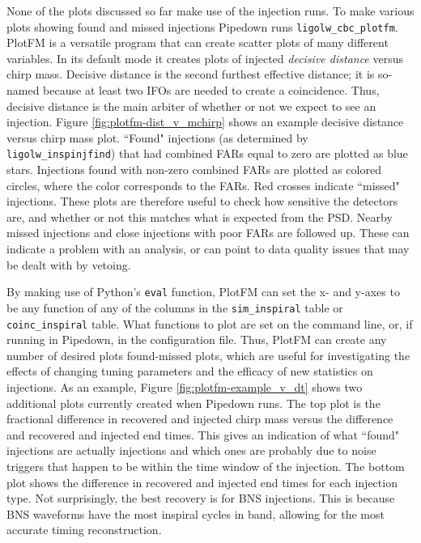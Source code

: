 None of the plots discussed so far make use of the injection runs. To make various plots showing found and missed injections Pipedown runs \verb|ligolw_cbc_plotfm|. PlotFM is a versatile program that can create scatter plots of many different variables. In its default mode it creates plots of injected \emph{decisive distance} versus chirp mass. Decisive distance is the second furthest effective distance; it is so-named because at least two \acp{IFO} are needed to create a coincidence. Thus, decisive distance is the main arbiter of whether or not we expect to see an injection. Figure \ref{fig:plotfm-dist_v_mchirp} shows an example decisive distance versus chirp mass plot. ``Found" injections (as determined by \verb|ligolw_inspinjfind|) that had combined \acp{FAR} equal to zero are plotted as blue stars. Injections found with non-zero combined \acp{FAR} are plotted as colored circles, where the color corresponds to the \acp{FAR}. Red crosses indicate ``missed" injections. These plots are therefore useful to check how sensitive the detectors are, and whether or not this matches what is expected from the \ac{PSD}. Nearby missed injections and close injections with poor \acp{FAR} are followed up. These can indicate a problem with an analysis, or can point to data quality issues that may be dealt with by vetoing.

By making use of Python's \verb|eval| function, PlotFM can set the x- and y-axes to be any function of any of the columns in the \verb|sim_inspiral| table or \verb|coinc_inspiral| table. What functions to plot are set on the command line, or, if running in Pipedown, in the configuration file. Thus, PlotFM can create any number of desired plots found-missed plots, which are useful for investigating the effects of changing tuning parameters and the efficacy of new statistics on injections. As an example, Figure \ref{fig:plotfm-example_v_dt} shows two additional plots currently created when Pipedown runs. The top plot is the fractional difference in recovered and injected chirp mass versus the difference and recovered and injected end times. This gives an indication of what ``found" injections are actually injections and which ones are probably due to noise triggers that happen to be within the time window of the injection. The bottom plot shows the difference in recovered and injected end times for each injection type. Not surprisingly, the best recovery is for \ac{BNS} injections. This is because \ac{BNS} waveforms have the most inspiral cycles in band, allowing for the most accurate timing reconstruction.

